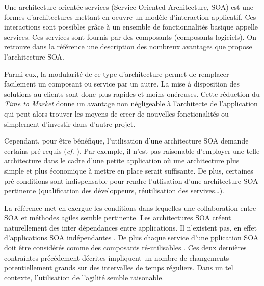 \documentclass[11pt,a4paper,utf8x]{article}
\begin{document}
Une architecture orientée services (Service Oriented Architecture, SOA) est une formes d'architectures mettant en oeuvre un modèle d'interaction applicatif. Ces interactions sont possibles grâce à un ensemble de fonctionnalités basique appelle services. Ces services sont fournis par des composants (composants logiciels). On retrouve dans la référence \cite{soa} une description des nombreux avantages que propose l'architecture SOA.


Parmi eux, la modularité de ce type d'architecture permet de remplacer facilement un composant ou service par un autre. La mise à disposition des solutions au clients sont donc plus rapides et moins onéreuses. Cette réduction du \emph{Time to Market} donne un avantage non négligeable à l'architecte de l'application qui peut alors trouver les moyens de creer de nouvelles fonctionalités ou simplement d'investir dans d'autre projet.


Cependant, pour être bénéfique, l'utilisation d'une architecture SOA demande certains pré-requis (\textit{cf.} \cite{soa}). Par exemple, il n'est pas raisonable d'employer une telle architecture dans le cadre d'une petite application où une architecture plus simple et plus économique à mettre en place serait suffisante. De plus, certaines pré-conditions sont indispensable pour rendre l'utlisation d'une architecture SOA pertinente (qualification des développeurs, réutilisation des servives\dots).


La référence \cite{ibm} met en exergue les conditions dans lequelles une collaboration entre SOA et méthodes agiles semble pertinente. Les architectures SOA créent naturellement des inter dépendances entre applications. Il n'existent pas, en effet d'applications SOA \og indépendantes \fg{}. De plus chaque service d'une pplication SOA doit être considérés comme des composants \og ré-utilisables \fg{}. Ces deux dernières contraintes précédement décrites impliquent un nombre de changements potentiellement grands sur des intervalles de temps réguliers. Dans un tel contexte, l'utilisation de l'agilité semble raisonable.  





% 
%
% 
% 
% 


% 


\end{document}
